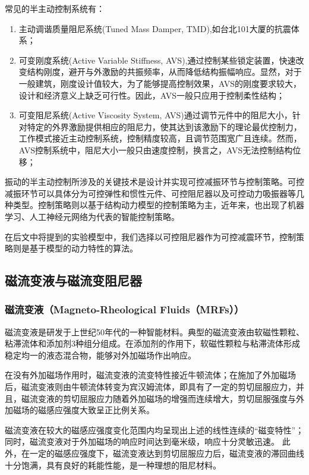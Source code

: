 常见的半主动控制系统有：
\begin{enumerate}[leftmargin=*,labelindent=16pt,label=\bfseries \arabic*.]
	\item 主动调谐质量阻尼系统(Tuned Mass Damper, TMD),如台北101大厦的抗震体系；
	\item 可变刚度系统(Active Variable Stiffness, AVS),通过控制某些锁定装置，快速改变结构刚度，避开与外激励的共振频率，从而降低结构振幅响应。\cite{Lijing2006}显然，对于一般建筑，刚度设计值较大，为了能够提高控制效果，AVS的刚度要求较大，设计和经济意义上缺乏可行性。因此，AVS一般只应用于控制柔性结构；
	\item 可变阻尼系统(Active Viscosity System, AVS)通过调节元件中的阻尼大小，针对特定的外界激励提供相应的阻尼力，使其达到该激励下的理论最优控制力，工作模式接近主动控制系统，控制精度较高，且调节范围宽广且连续。然而，AVS控制系统中，阻尼大小一般只由速度控制，换言之，AVS无法控制结构位移；
\end{enumerate}

振动的半主动控制所涉及的关键技术是设计并实现可控减振环节与控制策略。\cite{Hu2001}可控减振环节可以具体分为可控弹性和惯性元件、可控阻尼器以及可控动力吸振器等几种类型。控制策略则以基于结构动力模型的控制策略为主，近年来，也出现了机器学习、人工神经元网络为代表的智能控制策略。

在后文中将提到的实验模型中，我们选择以可控阻尼器作为可控减震环节，控制策略则是基于模型的动力特性的算法。

\subsection{磁流变液与磁流变阻尼器}
\subsubsection{磁流变液（Magneto-Rheological Fluids（MRFs））}
磁流变液是研发于上世纪50年代的一种智能材料。典型的磁流变液由软磁性颗粒、粘滞流体和添加剂3种组分组成。在添加剂的作用下，软磁性颗粒与粘滞流体形成稳定均一的液态混合物，能够对外加磁场作出响应。

在没有外加磁场作用时，磁流变液的流变特性接近牛顿流体；在施加了外加磁场后，磁流变液则由牛顿流体转变为宾汉姆流体，即具有了一定的剪切屈服应力，并且，磁流变液的剪切屈服应力随着外加磁场的增强而连续增大，剪切屈服强度与外加磁场的磁感应强度大致呈正比例关系。

磁流变液在较大的磁感应强度变化范围内均呈现出上述的线性连续的“磁变特性”；同时，磁流变液对于外加磁场的响应时间达到毫米级，响应十分灵敏迅速\cite{Ali2015}。
此外，在一定的磁感应强度下，磁流变液达到剪切屈服应力后，磁流变液的滞回曲线十分饱满，具有良好的耗能性能，是一种理想的阻尼材料。

